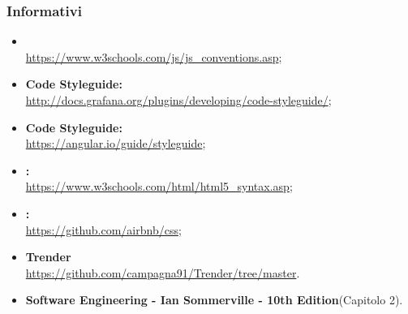 \subsubsection{Informativi}
\begin{itemize}
	\item \textbf{} \\
	\url{https://www.w3schools.com/js/js_conventions.asp};
	\item \textbf{ Code Styleguide:} \\
	\url{http://docs.grafana.org/plugins/developing/code-styleguide/};
	\item \textbf{ Code Styleguide:} \\
	\url{https://angular.io/guide/styleguide};
	\item \textbf{:} \\
	\url{https://www.w3schools.com/html/html5_syntax.asp};
	\item \textbf{:} \\
	\url{https://github.com/airbnb/css};
		\item \textbf{Trender} \\
	\url{https://github.com/campagna91/Trender/tree/master}.
		\item \textbf{Software Engineering - Ian Sommerville - 10th Edition}(Capitolo 2).
\end{itemize}
\pagebreak
